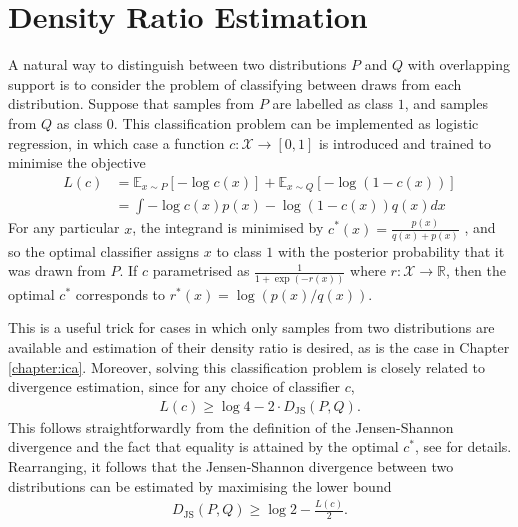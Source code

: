 



\section{Density Ratio Estimation}\label{sec:literature-density-ratio-estimation}

A natural way to distinguish between two distributions $P$ and $Q$ with overlapping support is to consider the problem of classifying between draws from each distribution.
Suppose that samples from $P$ are labelled as class $1$, and samples from $Q$ as class $0$. 
This classification problem can be implemented as logistic regression, in which case a function $c:\mathcal{X}\to [0,1]$ is introduced and trained to minimise the objective 
%
\begin{align*}
L(c) &=  \mathbb{E}_{x\sim P}\left[ - \log c(x) \right] + \mathbb{E}_{x \sim Q} \left[ - \log(1 - c(x)) \right] \\
&= \int -\log c(x) p(x) - \log (1 - c(x)) q(x) dx
\end{align*}
%
For any particular $x$, the integrand is minimised by $c^*(x) = \frac{p(x)}{q(x) + p(x)}$ \citep{goodfellow2014generative}, and so the optimal classifier assigns $x$ to class $1$ with the posterior probability that it was drawn from $P$.
If $c$ parametrised as $\frac{1}{1+\exp( -r(x))}$ where $r:\mathcal{X}\to\mathbb{R}$, then the optimal  $c^*$ corresponds to $r^*(x) = \log\left(p(x) / q(x)\right)$.

This is a useful trick for cases in which only samples from two distributions are available and estimation of their density ratio is desired, as is the case in Chapter \ref{chapter:ica}.
Moreover, solving this classification problem is closely related to divergence estimation, since for any choice of classifier $c$,
%
\begin{align*}
L(c) \geq \log 4 - 2 \cdot D_{\text{JS}}(P, Q).
\end{align*}
%
This follows straightforwardly from the definition of the Jensen-Shannon divergence and the fact that equality is attained by the optimal $c^*$, see \cite{goodfellow2014generative} for details.
Rearranging, it follows that the Jensen-Shannon divergence between two distributions can be estimated by maximising the lower bound
%
\begin{align*}
D_{\text{JS}}(P, Q) \geq \log 2 - \frac{L(c)}{2}.
\end{align*}

